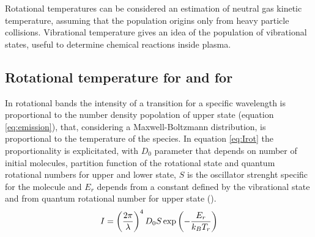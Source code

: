 Rotational temperatures can be considered an estimation of neutral gas kinetic temperature, assuming that the population origins only from heavy particle collisions. Vibrational temperature gives an idea of the population of vibrational states, useful to determine chemical reactions inside plasma.

\subsection{Rotational temperature for  and for }
In rotational bands the intensity of a transition for a specific wavelength is proportional to the number density popolation of upper state (equation \ref{eq:emission}), that, considering a Maxwell-Boltzmann distribution, is proportional to the temperature of the species. In equation \ref{eq:Irot} the proportionality is explicitated, with $D_{0}$ parameter that depends on number of initial molecules, partition function of the rotational state and quantum rotational numbers for upper and lower state, $S$ is the oscillator strenght specific for the molecule and $E_{r}$ depends from a constant defined by the vibrational state and from quantum rotational number for upper state (\cite{MOON2003249}).
\begin{equation}
 \centering
 I = \left(\frac{2 \pi}{\lambda}\right)^4 D_0 S \exp\left(-\frac{E_r}{k_B T_r}\right)
 \label{eq:Irot}
\end{equation}

